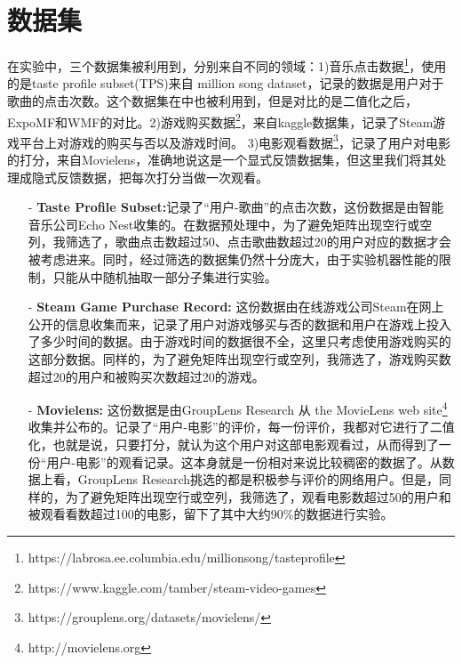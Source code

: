 \documentclass[notitlepage,cs4size,punct,oneside]{ctexrep}
\numberwithin{equation}{chapter}
\theoremstyle{mystyle}
\begin{document}
\section{数据集}
在实验中，三个数据集被利用到，分别来自不同的领域：1)音乐点击数据\footnote{https://labrosa.ee.columbia.edu/millionsong/tasteprofile}，使用的是taste profile subset(TPS)来自 million song dataset\cite{MSD}，记录的数据是用户对于歌曲的点击次数。这个数据集在\cite{EXPOMF}中也被利用到，但是对比的是二值化之后，ExpoMF和WMF的对比。2)游戏购买数据\footnote{https://www.kaggle.com/tamber/steam-video-games}，来自kaggle数据集，记录了Steam游戏平台上对游戏的购买与否以及游戏时间。 3)电影观看数据\footnote{https://grouplens.org/datasets/movielens/}，记录了用户对电影的打分，来自Movielens\cite{MLS}，准确地说这是一个显式反馈数据集，但这里我们将其处理成隐式反馈数据，把每次打分当做一次观看。
\begin{itemize}
	\item[-] \textbf{Taste Profile Subset:}记录了“用户-歌曲”的点击次数，这份数据是由智能音乐公司Echo Nest收集的。在数据预处理中，为了避免矩阵出现空行或空列，我筛选了，歌曲点击数超过50、点击歌曲数超过20的用户对应的数据才会被考虑进来。同时，经过筛选的数据集仍然十分庞大，由于实验机器性能的限制，只能从中随机抽取一部分子集进行实验。
	\item[-] \textbf{Steam Game Purchase Record:} 这份数据由在线游戏公司Steam在网上公开的信息收集而来，记录了用户对游戏够买与否的数据和用户在游戏上投入了多少时间的数据。由于游戏时间的数据很不全，这里只考虑使用游戏购买的这部分数据。同样的，为了避免矩阵出现空行或空列，我筛选了，游戏购买数超过20的用户和被购买次数超过20的游戏。
	\item[-] \textbf{Movielens:} 这份数据是由GroupLens Research 从 the MovieLens web site\footnote{http://movielens.org}收集并公布的。记录了“用户-电影”的评价，每一份评价，我都对它进行了二值化，也就是说，只要打分，就认为这个用户对这部电影观看过，从而得到了一份“用户-电影”的观看记录。这本身就是一份相对来说比较稠密的数据了。从数据上看，GroupLens Research挑选的都是积极参与评价的网络用户。但是，同样的，为了避免矩阵出现空行或空列，我筛选了，观看电影数超过50的用户和被观看看数超过100的电影，留下了其中大约90\%的数据进行实验。

\end{itemize}
\end{document}
